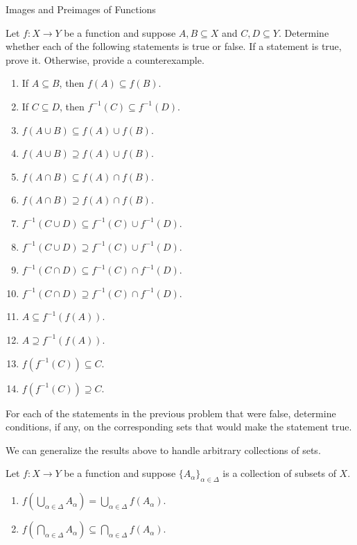 \begin{section}{Images and Preimages of Functions}
\begin{problem}
Let $f:X\to Y$ be a function and suppose $A, B\subseteq X$ and $C, D\subseteq Y$. Determine whether each of the following statements is true or false. If a statement is true, prove it.  Otherwise, provide a counterexample.
\begin{enumerate}[label=\textrm{(\alph*)}]
\item If $A\subseteq B$, then $f(A)\subseteq f(B)$.
\item If $C\subseteq D$, then $f^{-1}(C)\subseteq f^{-1}(D)$.
\item $f(A\cup B)\subseteq f(A)\cup f(B)$.
\item $f(A\cup B)\supseteq f(A)\cup f(B)$.
\item $f(A\cap B)\subseteq f(A)\cap f(B)$.
\item $f(A\cap B)\supseteq f(A)\cap f(B)$.
\item $f^{-1}(C\cup D)\subseteq f^{-1}(C)\cup f^{-1}(D)$.
\item $f^{-1}(C\cup D)\supseteq f^{-1}(C)\cup f^{-1}(D)$.
\item $f^{-1}(C\cap D)\subseteq f^{-1}(C)\cap f^{-1}(D)$.
\item $f^{-1}(C\cap D)\supseteq f^{-1}(C)\cap f^{-1}(D)$.
\item $A\subseteq f^{-1}(f(A))$.
\item $A\supseteq f^{-1}(f(A))$.
\item $f(f^{-1}(C))\subseteq C$.
\item $f(f^{-1}(C))\supseteq C$.
\end{enumerate}
\end{problem}

\begin{problem}
For each of the statements in the previous problem that were false, determine conditions, if any, on the corresponding sets that would make the statement true.
\end{problem}

We can generalize the results above to handle arbitrary collections of sets.

\begin{theorem}\label{thm:unions and intersections of images}
Let $f:X\to Y$ be a function and suppose $\{A_{\alpha}\}_{\alpha\in\Delta}$ is a collection of subsets of $X$.
\begin{enumerate}[label=\textrm{(\alph*)}]
\item $\displaystyle f\left(\bigcup_{\alpha\in\Delta} A_{\alpha}\right)=\bigcup_{\alpha\in\Delta} f\left(A_{\alpha}\right)$.
\item $\displaystyle f\left(\bigcap_{\alpha\in\Delta} A_{\alpha}\right)\subseteq\bigcap_{\alpha\in\Delta} f\left(A_{\alpha}\right)$.
\end{enumerate}
\end{theorem}


\end{section}
